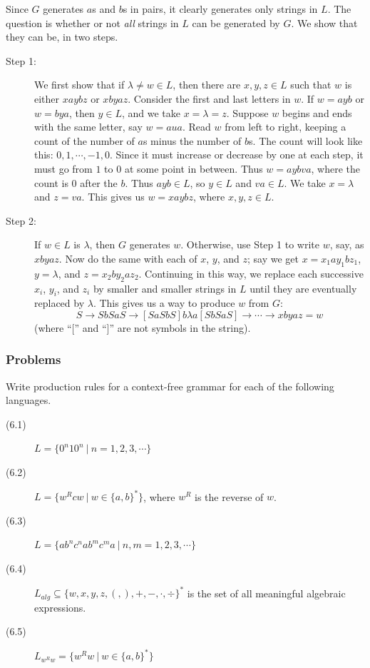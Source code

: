 \documentclass{article}
\begin{document}
\begin{description}
  Since $G$ generates $a$s and $b$s in pairs, it clearly generates only strings in $L$. The question is whether or not \emph{all} strings in $L$ can be generated by $G$. We show that they can be, in two steps.
  \begin{description}
    \item[Step 1:] We first show that if $\lambda \neq w \in L$, then there are $x,y,z \in L$ such that $w$ is either $xaybz$ or $xbyaz$. Consider the first and last letters in $w$. If $w = ayb$ or $w = bya$, then $y \in L$, and we take $x = \lambda = z$. Suppose $w$ begins and ends with the same letter, say $w = aua$. Read $w$ from left to right, keeping a count of the number of $a$s minus the number of $b$s. The count will look like this: $0, 1, \cdots, -1, 0$. Since it must increase or decrease by one at each step, it must go from $1$ to $0$ at some point in between. Thus $w = aybva$, where the count is $0$ after the $b$. Thus $ayb \in L$, so $y \in L$ and $va \in L$. We take $x = \lambda$ and $z = va$. This gives us $w = xaybz$, where $x,y,z \in L$. 
    \item[Step 2:] If $w \in L$ is $\lambda$, then $G$ generates $w$. Otherwise, use Step 1 to write $w$, say, as $xbyaz$. Now do the same with each of $x$, $y$, and $z$; say we get $x = x_1 ay_1 bz_1$, $y = \lambda$, and $z = x_2 by_2 az_2$. Continuing in this way, we replace each successive $x_i$, $y_i$, and $z_i$ by smaller and smaller strings in $L$ until they are eventually replaced by $\lambda$. This gives us a way to produce $w$ from $G$:
      \begin{equation*}
      S \to SbSaS \to [SaSbS] b \lambda a[SbSaS] \to \cdots \to xbyaz = w
      \end{equation*}
      (where ``['' and ``]'' are not symbols in the string).
  \end{description}

\end{description}


\subsubsection*{Problems}

Write production rules for a context-free grammar for each of the following languages.

\begin{description}
  \item[(6.1)] $L = \{ 0^n 10^n\ |\ n=1,2,3,\cdots \}$ 
  \item[(6.2)] $L = \{ w^R cw\ |\ w \in \{a,b\}^* \}$, where $w^R$ is the reverse of $w$.
  \item[(6.3)] $L = \{ ab^n c^n ab^m c^m a\ |\ n,m=1,2,3,\cdots \}$
  \item[(6.4)] $L_{alg} \subseteq \{ w,x,y,z,(,),+,-,\cdot,\div \}^*$ is the set of all meaningful algebraic expressions.
  \item[(6.5)] $L_{w^Rw} = \{ w^R w\ |\ w \in \{a,b\}^* \}$
\end{description}
\end{document}
